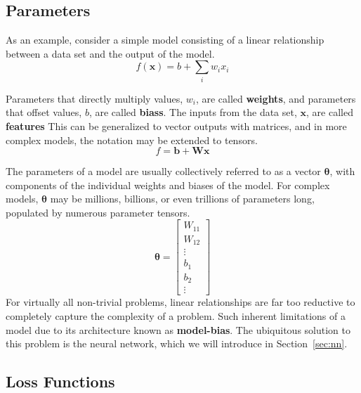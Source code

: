\documentclass[12pt]{report}
\theoremstyle{definition}
\theoremstyle{remark}
\begin{document}
\subsection{Parameters}

As an example, consider a simple model consisting of a linear relationship between a data set and the output of the model.
\begin{equation}
    f(\mathbf{x}) = b +\sum_i w_i x_i
\end{equation}

Parameters that directly multiply values, $w_i$, are called \textbf{\glspl{weight}}, and parameters that offset values, $b$, are called \textbf{\glspl{bias}}. The inputs from the data set, $\mathbf{x}$, are called \textbf{\glspl{feature}} This can be generalized to vector outputs with matrices, and in more complex models, the notation may be extended to tensors.
\begin{equation}
    f = \mathbf{b} + \mathbf{W}\mathbf{x}
\end{equation}

The parameters of a model are usually collectively referred to as a vector $\boldsymbol{\theta}$, with components of the individual weights and biases of the model. For complex models, $\boldsymbol{\theta}$ may be millions, billions, or even trillions of parameters long, populated by numerous parameter tensors.
\begin{equation}
    \boldsymbol{\theta} = \begin{bmatrix}
        W_{11} \\
        W_{12} \\
        \vdots \\
        b_1 \\
        b_2 \\
        \vdots
    \end{bmatrix}
\end{equation}
For virtually all non-trivial problems, linear relationships are far too reductive to completely capture the complexity of a problem. Such inherent limitations of a model due to its architecture known as \textbf{\gls{model-bias}}. The ubiquitous solution to this problem is the neural network, which we will introduce in Section~\ref{sec:nn}.


\subsection{Loss Functions}
\end{document}
